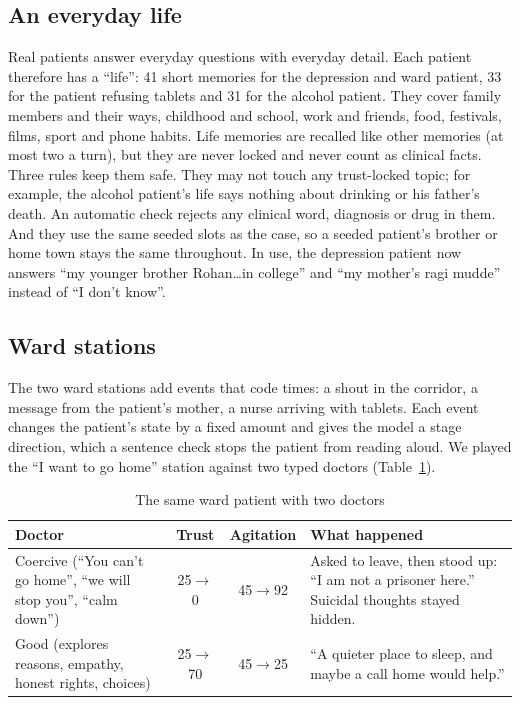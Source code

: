 \documentclass{article}
\begin{document}
\subsection{An everyday life}
Real patients answer everyday questions with everyday detail. Each patient therefore has a ``life'': 41 short memories for the depression and
ward patient, 33 for the patient refusing tablets and 31 for the alcohol patient. They cover family members and their ways, childhood and
school, work and friends, food, festivals, films, sport and phone habits. Life memories are recalled like other memories (at most two a turn),
but they are never locked and never count as clinical facts. Three rules keep them safe. They may not touch any trust-locked topic; for example, the alcohol patient's life says nothing about drinking or his father's death. An automatic check rejects any clinical word, diagnosis or drug in them. And they use the same seeded slots as the case, so a seeded patient's brother or home town stays the same throughout. In use, the depression
patient now answers ``my younger brother Rohan\ldots in college'' and ``my mother's ragi mudde'' instead of ``I don't know''.

\subsection{Ward stations}
The two ward stations add events that code times: a shout in the corridor, a message from the patient's mother, a nurse arriving with tablets. Each event
changes the patient's state by a fixed amount and gives the model a stage direction, which a sentence check stops the patient from reading
aloud. We played the ``I want to go home'' station against two typed doctors (Table~\ref{tab:ward}).

\begin{table}[t]
\caption{The same ward patient with two doctors}
\label{tab:ward}
\centering
\scriptsize

\begin{tabular}{lccl}
\toprule
Doctor & Trust & Agitation & What happened\\
\midrule
Coercive (``You can't go home'', ``we will stop you'', ``calm down'') & 25$\to$0 & 45$\to$92 & Asked to leave, then stood up: ``I am not a
prisoner here.'' Suicidal thoughts stayed hidden.\\
Good (explores reasons, empathy, honest rights, choices) & 25$\to$70 & 45$\to$25 & ``A quieter place to sleep, and maybe a call home would
help.''\\
\bottomrule
\end{tabular}
\end{table}
\end{document}
